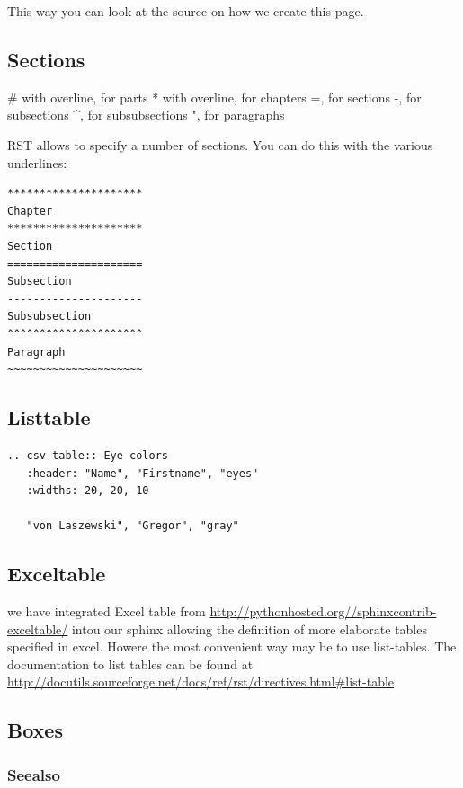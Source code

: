 This way you can look at the source on how we create this page.

\subsection{Sections}\label{sections}

\# with overline, for parts * with overline, for chapters =, for
sections -, for subsections \^{}, for subsubsections ", for paragraphs

RST allows to specify a number of sections. You can do this with the
various underlines:

\begin{verbatim}
*********************
Chapter
*********************
Section
=====================
Subsection
---------------------
Subsubsection
^^^^^^^^^^^^^^^^^^^^^
Paragraph
~~~~~~~~~~~~~~~~~~~~~
\end{verbatim}

\subsection{Listtable}\label{listtable}

\begin{verbatim}
.. csv-table:: Eye colors
   :header: "Name", "Firstname", "eyes"
   :widths: 20, 20, 10

   "von Laszewski", "Gregor", "gray"
\end{verbatim}

\subsection{Exceltable}\label{exceltable}

we have integrated Excel table from
\url{http://pythonhosted.org//sphinxcontrib-exceltable/} intou our
sphinx allowing the definition of more elaborate tables specified in
excel. Howere the most convenient way may be to use list-tables. The
documentation to list tables can be found at
\url{http://docutils.sourceforge.net/docs/ref/rst/directives.html\#list-table}

\subsection{Boxes}\label{boxes}

\subsubsection{Seealso}\label{seealso}

